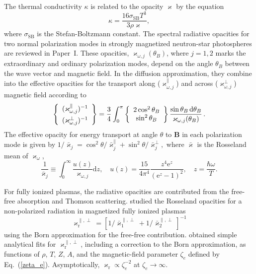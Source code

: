 \documentclass[smallextended]{svjour3}       %
\newcommand{\dd}{\mathrm{d}}
\newcommand{\opac}{\varkappa}
\newcommand{\req}[1]{Eq.~(\ref{#1})}
\newcommand{\sSB}{\sigma_\mathrm{SB}}
\newcommand{\zete}{\zeta_e}
\begin{document}
The thermal conductivity $\kappa$ is related to the opacity
$\opac$ by the equation 
\begin{equation} 
  \kappa =
  \frac{16\sSB T^3}{3\rho\opac},
\label{opacity}
\end{equation} 
where $\sSB$ is the Stefan-Boltzmann constant.  The spectral
radiative opacities for two normal polarization modes in
strongly magnetized neutron-star photospheres are reviewed
in Paper~I. These opacities, $\opac_{\omega,j}(\theta_B)$,
where $j=1,2$ marks the extraordinary and ordinary
polarization modes, depend on the angle $\theta_B$ between
the wave vector and magnetic field.  In the diffusion
approximation,  they combine into the effective opacities
for the transport along ($\opac_{\omega,j}^\|$) and across
($\opac_{\omega,j}^\perp$) magnetic field according to 
\begin{equation}
\left\{
   \begin{array}{c}
 (\opac_{\omega,j}^\|)^{-1}
\\
   (\opac_{\omega,j}^{\perp})^{-1\rule{0pt}{2ex}}
   \end{array}
  \right\}
 = \frac34 \int_0^\pi
\left\{
   \begin{array}{c}
2\cos^2\theta_B \\
\sin^2\theta_B
\end{array}
  \right\}
\frac{\sin\theta_B\,\dd\theta_B}{\opac_{\omega,j}(\theta_B)}\,.
\label{kappa-eff}
\end{equation}      
The effective opacity for energy transport
at angle $\theta$
to $\bm{B}$ in each
polarization mode is given by
$
1/\bar\opac_j =
\cos^2\theta/\bar\opac_j^\|
 + \sin^2\theta/\bar\opac_j^\perp,
$
where $\bar\opac$ is the
Rosseland mean of $\opac_\omega$,
\begin{equation}
\frac{1}{\bar\opac_j} \equiv
    \int_0^{\infty}\frac{u(z)}{\opac_{\omega,j}}
 \dd z ,
\quad
 u(z) = \frac{15}{4\pi^4}
\frac{z^4\mathrm{e}^z}{(\mathrm{e}^z-1)^2},
\quad 
  z =  \frac{\hbar\omega}{T}.
\end{equation}

For fully ionized plasmas, the radiative opacities are
contributed from the free-free absorption and Thomson
scattering.
\citet{SilYak} studied the Rosseland
opacities for a non-polarized radiation in magnetized fully
ionized plasmas
\begin{equation}
\opac_\mathrm{r}^{\|,\perp}=\left[ 
    1/\bar\opac_1^{\|,\perp} + 1/\bar\opac_2^{\|,\perp}
\right]^{-1}
\end{equation}
using the Born approximation for the
free-free  contribution.
\citet{PY01} obtained simple analytical fits for
$\opac_\mathrm{r}^{\|,\perp}$, including a correction to the
Born approximation, as functions of $\rho$, $T$, $Z$, $A$,
and the magnetic-field parameter $\zete$ defined by \req{zeta_e}.
Asymptotically, $\opac_\mathrm{r}\propto \zete^{-2}$ at
$\zete\to \infty$.
\end{document}
